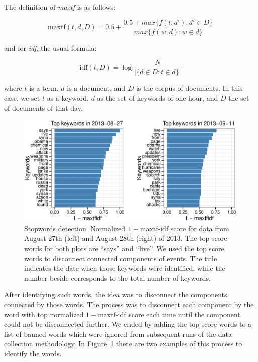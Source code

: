 The definition of \emph{maxtf} is as follows:

\begin{equation}
\text{maxtf}(t,\mathit{d},D) = 0.5 + \frac{0.5 + max\{f(t,\mathit{d}') : \mathit{d}' \in D\}}{max\{f(w,\mathit{d}) : w \in \mathit{d}\}}
\end{equation}

and for \emph{idf}, the usual formula:

\begin{equation}
\text{idf}(t,D) = \log\frac{N}{|\{\mathit{d} \in D : t \in \mathit{d}\}|}
\end{equation}

\noindent where $t$ is a term, $\mathit{d}$ is a document, and $D$ is the corpus
of documents. 
%
In this case, we set $t$ as a keyword, $\mathit{d}$ as the set of keywords of
one hour, and $D$ the set of documents of that day.

\begin{figure}
\begin{center}
\includegraphics[width=\textwidth]{figures/data/stopwords}
\caption[Stopwords detection.]{Stopwords detection. Normalized
  $1-\text{maxtf-idf}$ score for data from August 27th (left) and August 28th
  (right) of 2013. The top score words for both plots are ``says'' and ``live''.
  We used the top score words to disconnect connected components of events. The
  title indicates the date when those keywords were identified, while the number
  beside corresponds to the total number of keywords.}
\label{fig:stopwords}
\end{center}
\end{figure}


After identifying such words, the idea was to disconnect the components
connected by those words. 
%
The process was to disconnect each component by the word with top normalized
$1-\text{maxtf-idf}$ score each time until the component could not be
disconnected further. 
%
We ended by adding the top score words to a list of banned words which were
ignored from subsequent runs of the data collection methodology. 
%
In Figure~\ref{fig:stopwords} there are two examples of this process to identify
the words.


